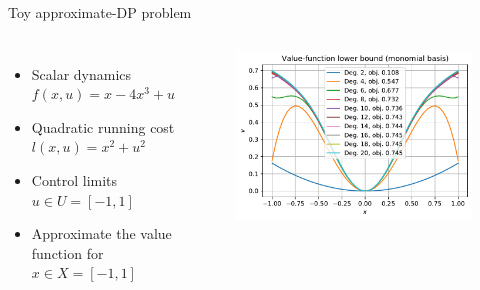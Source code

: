 \documentclass[aspectratio=169]{beamer}
\begin{document}
\begin{frame}{Toy approximate-DP problem
\href{https://colab.research.google.com/github/TobiaMarcucci/optimal_control_pisa/blob/master/demos/approximate_dp_scalar.ipynb}{}}
\begin{columns}
\begin{itemize}
	\item
	Scalar dynamics $f(x, u)= x - 4 x^3 + u$
	\item
	Quadratic running cost $l(x, u) = x^2 + u^2$
	\item
	Control limits $u \in U = [-1, 1]$
	\item
	Approximate the value function for $x \in X = [-1, 1]$
\end{itemize}
	\begin{figure}
		\includegraphics[width=\columnwidth]{figures/approximate_dp_scalar.pdf}
	\end{figure}
\end{columns}
\end{frame}
\end{document}

